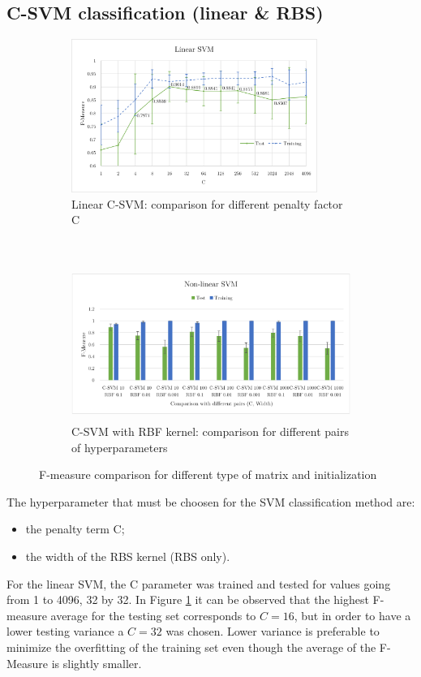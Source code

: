 \documentclass[a4paper,10pt]{article}
\begin{document}
\subsection{C-SVM classification (linear \& RBS)}

\begin{figure}[H]
\centering
    \begin{subfigure}[t]{0.45\textwidth}
      \centering
      \includegraphics[height=5cm]{pictures/linear-SVM}
      \caption{Linear C-SVM: comparison for different penalty factor C}
      \label{fig:linear-SVM}
     \end{subfigure}
      ~
    \begin{subfigure}[t]{0.45\textwidth}
      \centering
      \includegraphics[height=5cm]{pictures/non-linear-SVM}
      \caption{C-SVM with RBF kernel: comparison for different pairs of hyperparameters}
      \label{fig:non-linear-SVM}
     \end{subfigure}
     \caption{F-measure comparison for different type of matrix and initialization}
\end{figure}

The hyperparameter that must be choosen for the SVM classification method are:
\begin{itemize}
  \item the penalty term C;
  \item the width of the RBS kernel (RBS only).
\end{itemize}

 For the linear SVM, the C parameter was trained and tested for values going from 1 to 4096, 32 by 32. In Figure \ref{fig:linear-SVM} it can be observed that the highest F-measure average for the testing set corresponds to $C=16$, but in order to have a lower testing variance a $C = 32$ was chosen. Lower variance is preferable to minimize the overfitting of the training set even though the average of the F-Measure is slightly smaller.\\
\end{document}
